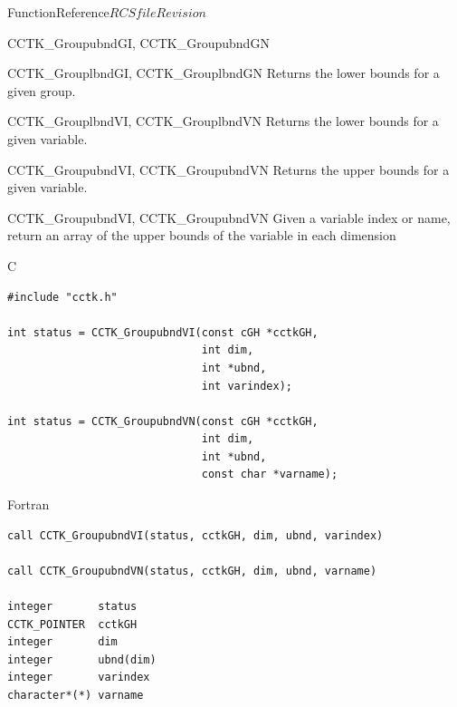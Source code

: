 \begin{cactuspart}{FunctionReference}{$RCSfile$}{$Revision$}
\begin{FunctionDescription}{CCTK\_GroupubndGI, CCTK\_GroupubndGN}
\begin{SeeAlsoSection}
\begin{SeeAlso}{CCTK\_GrouplbndGI, CCTK\_GrouplbndGN}
Returns the lower bounds for a given group.
\end{SeeAlso}
\begin{SeeAlso}{CCTK\_GrouplbndVI, CCTK\_GrouplbndVN}
Returns the lower bounds for a given variable.
\end{SeeAlso}
\begin{SeeAlso}{CCTK\_GroupubndVI, CCTK\_GroupubndVN}
Returns the upper bounds for a given variable.
\end{SeeAlso}
\end{SeeAlsoSection}

\end{FunctionDescription}


\begin{FunctionDescription}{CCTK\_GroupubndVI, CCTK\_GroupubndVN}
\label{CCTK-GroupubndVI}
\label{CCTK-GroupubndVN}
Given a variable index or name, return an array of the upper bounds of the variable in each dimension

\begin{SynopsisSection}
\begin{Synopsis}{C}
\begin{verbatim}
#include "cctk.h"

int status = CCTK_GroupubndVI(const cGH *cctkGH,
                              int dim,
                              int *ubnd,
                              int varindex);

int status = CCTK_GroupubndVN(const cGH *cctkGH,
                              int dim,
                              int *ubnd,
                              const char *varname);
\end{verbatim}
\end{Synopsis}
\begin{Synopsis}{Fortran}
\begin{verbatim}
call CCTK_GroupubndVI(status, cctkGH, dim, ubnd, varindex)

call CCTK_GroupubndVN(status, cctkGH, dim, ubnd, varname)

integer       status
CCTK_POINTER  cctkGH
integer       dim
integer       ubnd(dim)
integer       varindex
character*(*) varname
\end{verbatim}
\end{Synopsis}
\end{SynopsisSection}


\end{FunctionDescription}
\end{cactuspart}
